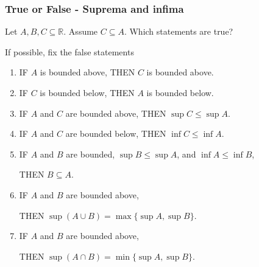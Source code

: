 \documentclass[14pt]{beamer}
\begin{document}
\begin{frame}[t]
	\fontsize{12}{12}\selectfont
	\frametitle{True or False - Suprema and infima}

	Let $A, B, C \subseteq \mathbb{R}$. Assume $C \subseteq A$. Which statements are
	true?
	\vspace{.1cm}

	If possible, fix the false statements
	\vspace{.2cm}
	\begin{enumerate}
		\item IF \;$A$ is bounded above, \; THEN \;$C$ is bounded above.

		\item IF \;$C$ is bounded below, \; THEN \;$A$ is bounded below.
			\vspace{.2cm}

		\item IF \;$A$ and $C$ are bounded above, \; THEN \;$\sup C \leq \sup A$.

		\item IF \;$A$ and $C$ are bounded below, \; THEN \;$\inf C \leq \inf A$.
			\vspace{.2cm}

		\item IF \;$A$ and $B$ are bounded, \;$\sup B \leq \sup A$, \;and \;$\inf A \leq
			\inf B$,
			\vspace{.1cm}

			THEN \;$B \subseteq A$.
			\vspace{.2cm}

		\item IF \;$A$ and $B$ are bounded above,
			\vspace{.1cm}

			THEN \;$\displaystyle \sup (A \cup B) =\max \{ \sup A, \sup B \}$.
			\vspace{.2cm}

		\item IF \;$A$ and $B$ are bounded above,
			\vspace{.1cm}

			THEN \;$\displaystyle \sup (A \cap B) =\min \{ \sup A, \sup B \}$.
	\end{enumerate}
\end{frame}
\end{document}
